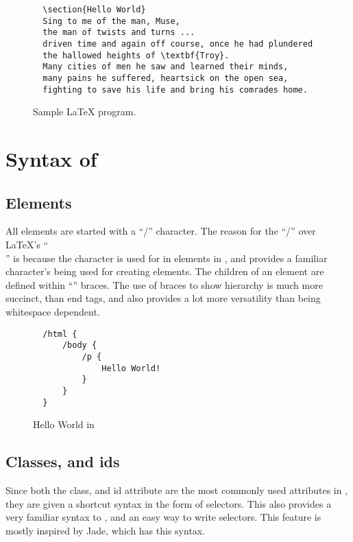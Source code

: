 \begin{figure}[ht!]
  \begin{verbatim}
  \section{Hello World}
  Sing to me of the man, Muse, 
  the man of twists and turns ... 
  driven time and again off course, once he had plundered 
  the hallowed heights of \textbf{Troy}. 
  Many cities of men he saw and learned their minds, 
  many pains he suffered, heartsick on the open sea, 
  fighting to save his life and bring his comrades home.
  \end{verbatim}
  \caption{Sample \LaTeX{} program.}
\end{figure}

\section{Syntax of \languageName{}}

\subsection{Elements}
All elements are started with a ``/'' character. The  reason for the ``/'' over \LaTeX{}'s ``\\'' is because the character is used for in elements in , and provides a familiar character's being used for creating elements. The children of an element are defined within ``{}'' braces. The use of braces to show hierarchy is much more succinct, than  end tags, and also provides a lot more versatility than being whitespace dependent.

\begin{figure}[ht!]
  \begin{verbatim}
  /html {
      /body {
          /p {
              Hello World!
          }
      }
  }
  \end{verbatim}
  \caption{Hello World in \languageName{}}
\end{figure}

\subsection{Classes, and ids}
Since both the class, and id attribute are the most commonly used attributes in , they are given a shortcut syntax in the form of  selectors. This also provides a very familiar syntax to \you{}, and an easy way to write  selectors. This feature is mostly inspired by Jade, which has this syntax. 

